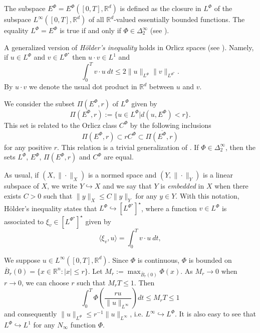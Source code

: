 \documentclass[twoside]{article}
\theoremstyle{remark}
\newcommand{\orlnor}{\|_{L^{\Phi}}}
\newcommand{\linf}{\|_{L^{\infty}}}
\newcommand{\lphi}{L^{\Phi}}
\newcommand{\lpsi}{L^{\Phi^{\star}}}
\newcommand{\ephi}{E^{\Phi}}
\newcommand{\claseor}{C^{\Phi}}
\newcommand{\rr}{\mathbb{R}}
\renewcommand{\leq}{\leqslant}
\begin{document}
The subspace $\ephi=\ephi\left([0,T],\rr^d\right)$ is defined as the closure in $\lphi$ of the subspace $L^{\infty}\left([0,T],\rr^d\right)$ of all $\mathbb{R}^d$-valued essentially bounded functions. The equality $\lphi=\ephi$ is true if and only if $\Phi\in\Delta_2^{\infty}$ (see \cite[Cor. 5.1]{Orliczvectorial2005}). 

A generalized version of \emph{H\"older's inequality} holds in Orlicz spaces (see \cite[Thm. 7.2]{Orliczvectorial2005}). Namely, if $u\in\lphi$ and $v\in\lpsi$ then $u\cdot v\in L^1$ and
\begin{equation}\label{holder}
\int_0^Tv\cdot u\ dt\leq 2 \|u\orlnor\|v\|_{L^{\Phi^{\star}}}.
\end{equation}
By $u\cdot v$ we denote the usual dot product in $\mathbb{R}^{d}$ between $u$ and $v$.

We consider the subset $\Pi(\ephi,r)$ of $\lphi$ given by
\[\Pi(\ephi,r):=\{u\in\lphi| d(u,\ephi)<r\}.\]
This set is related to the Orlicz class $\claseor$ by the following inclusions
\begin{equation}\label{eq:inclusiones}\Pi(\ephi, r )\subset r \claseor\subset\overline{\Pi(\ephi,r)}
\end{equation}
for any positive $r$. This relation is a trivial generalization of  \cite[Thm. 5.6]{Orliczvectorial2005}.
If $\Phi \in \Delta_2^{\infty}$,  then the sets $\lphi$, $\ephi$, $\Pi(\ephi,r)$ and $\claseor$ are equal.
 
As usual, if $(X,\|\cdot\|_X)$ is a normed space and $(Y,\|\cdot \|_Y)$ is a linear subspace of $X$,  we write $Y\hookrightarrow X$ and we say that $Y$ is \emph{embedded} in $X$  when there exists $C>0$ such that
$\|y\|_X\leq C\|y\|_Y$ for any $y\in Y$.  With this notation, H\"older's inequality states that  $\lphi\hookrightarrow  \left[\lpsi\right]^\star$, where a function $v\in\lphi$ is associated  to $\xi_v\in \left[\lpsi\right]^\star$ given by
\begin{equation}\label{pairing}
  \langle \xi_v,u\rangle=\int_0^Tv\cdot u\ dt,
\end{equation}


We suppose $u\in L^{\infty}([0,T],\rr^d)$. Since $\Phi$ is continuous, $\Phi$ is bounded on $\overline{B}_r(0)=\{x\in \rr^n:|x|\leq r\}$. Let $M_r:=\max_{\overline{B}_r(0)} \Phi(x)$. As $M_r\to 0$ when $r\to 0$, we can choose $r$ such that $M_rT\leq 1$. Then
\[\int_0^T \Phi\left(\frac{ru}{\|u\linf}\right)dt\leq M_rT\leq 1\]
and consequently
$\|u\orlnor \leq r^{-1}\|u\linf$, i.e. $L^{\infty} \hookrightarrow L^\Phi$. It is also easy to see that $L^\Phi \hookrightarrow L^1$ for any $N_{\infty}$ function $\Phi$.
\end{document}
